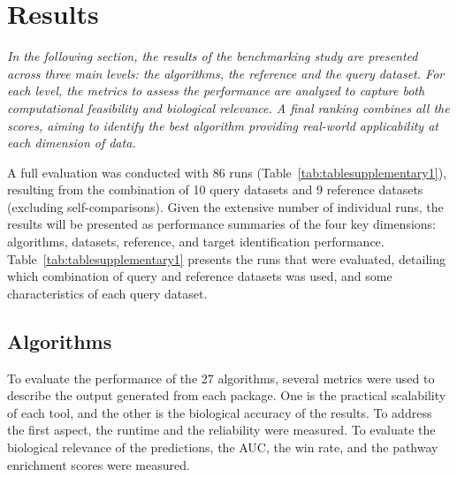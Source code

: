﻿%

%


\chapter{Results}
\label{cha:results}

\textit{In the following section, the results of the benchmarking study are presented across three main levels: the algorithms, the reference and the query dataset. For each level, the metrics to assess the performance are analyzed to capture both computational feasibility and biological relevance. A final ranking combines all the scores, aiming to identify the best algorithm providing real-world applicability at each dimension of data.}

\par

A full evaluation was conducted with 86 runs (Table~\ref{tab:tablesupplementary1}), resulting from the combination of 10 query datasets and 9 reference datasets (excluding self-comparisons). Given the extensive number of individual runs, the results will be presented as performance summaries of the four key dimensions: algorithms, datasets, reference, and target identification performance. Table~\ref{tab:tablesupplementary1} presents the runs that were evaluated, detailing which combination of query and reference datasets was used, and some characteristics of each query dataset.

\section{Algorithms} %
\label{sec:algorithmsresults}

To evaluate the performance of the 27 algorithms, several metrics were used to describe the output generated from each package.
One is the practical scalability of each tool, and the other is the biological accuracy of the results.
To address the first aspect, the runtime and the reliability were measured.
To evaluate the biological relevance of the predictions, the \gls{AUC}, the win rate, and the pathway enrichment scores were measured.

